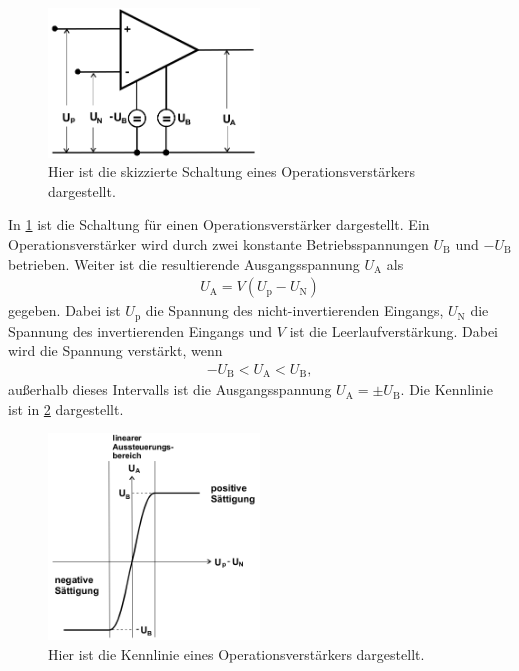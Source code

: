 
\begin{figure}[h!]
	\centering
	\includegraphics[width= 0.5\textwidth]{../Grafiken/OP_Schaltung.png}
	\caption{Hier ist die skizzierte Schaltung eines Operationsverstärkers dargestellt. \cite{V51}\label{fig:OP_Schaltung}}
\end{figure}
\noindent
In \cref{fig:OP_Schaltung} ist die Schaltung für einen Operationsverstärker dargestellt.
Ein Operationsverstärker wird durch zwei konstante Betriebsspannungen $U_\text{B}$ und $-U_\text{B}$ betrieben.
Weiter ist die resultierende Ausgangsspannung $U_\text{A}$ als
\begin{align}
	U_\text{A}=V(U_\text{p}-U_\text{N})
\end{align}
gegeben. 
Dabei ist $U_\text{p}$ die Spannung des nicht-invertierenden Eingangs, $U_\text{N}$ die Spannung des invertierenden Eingangs und $V$ ist die Leerlaufverstärkung.
Dabei wird die Spannung verstärkt, wenn 
\begin{align*}
	-U_\text{B}<U_\text{A}<U_\text{B},
\end{align*}
außerhalb dieses Intervalls ist die Ausgangsspannung $U_\text{A}=\pm U_\text{B}$.
Die Kennlinie ist in \cref{fig:Kennlinie} dargestellt.
\begin{figure}
	\centering
	\includegraphics[width = 0.5\textwidth]{../Grafiken/Op_Kennlinie.png}
	\caption{Hier ist die Kennlinie eines Operationsverstärkers dargestellt. \cite{V51}\label{fig:Kennlinie}}
\end{figure} 
